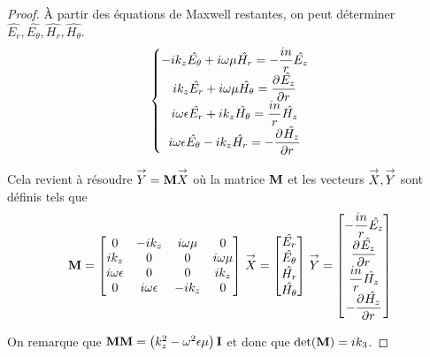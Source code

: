   \begin{proof}
    À partir des équations de Maxwell restantes, on peut déterminer \(\hat{E_r},\hat{E_\theta},\hat{H_r},\hat{H_\theta}\).
    \begin{equation}
      \left\lbrace
      \begin{matrix}
        -ik_z\hat{E_\theta} + i\w\mu \hat{H_r} = -\frac{in}{r}\hat{E_z}
        \\
        ik_z\hat{E_r} + i\w\mu \hat{H_\theta} = \ddr{r}{\hat{E_z}}
        \\
        i\w\eps \hat{E_r} + ik_z \hat{H_\theta} = \frac{in}{r}\hat{H_z}
        \\
        i\w\eps \hat{E_\theta} - ik_z \hat{H_r} = -\ddr{r}{\hat{H_z}}
      \end{matrix}
      \right.
    \end{equation}

    Cela revient à résoudre \(\vect{Y} = \mat{M}\vect{X}\) où la matrice \(\mat{M}\) et les vecteurs \(\vect{X}, \vect{Y}\) sont définis tels que
    \begin{equation}
      \mat{M} =
      \begin{bmatrix}
      0 & -ik_z & i\w\mu & 0
      \\
      ik_z & 0 & 0 & i\w\mu
      \\
      i\w\eps & 0 & 0 & ik_z
      \\
      0 & i\w\eps & -ik_z & 0
      \end{bmatrix}
      \,
      \vect{X} =
      \begin{bmatrix}
        \hat{E_r}\\
        \hat{E_\theta}\\
        \hat{H_r}\\
        \hat{H_\theta}
      \end{bmatrix}
      \,
      \vect{Y} =
      \begin{bmatrix}
        -\frac{in}{r}\hat{E_z}\\
        \ddr{r}{\hat{E_z}}\\
        \frac{in}{r}\hat{H_z}\\
        -\ddr{r}{\hat{H_z}}
      \end{bmatrix}
    \end{equation}

    On remarque que \(\mM\mM = \left(k_z^2 - \omega^2\eps\mu\right)\mI\) et donc que \(\det(\mat{M}) = ik_3\).



\end{proof}
